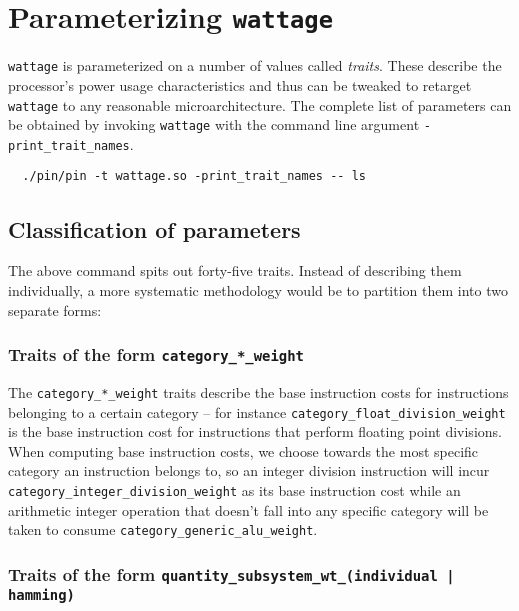 
\chapter{Parameterizing \texttt{wattage}} %

\label{AppendixA}


\texttt{wattage} is parameterized on a number of values called
\textit{traits}.  These describe the processor's power usage
characteristics and thus can be tweaked to retarget \texttt{wattage}
to any reasonable microarchitecture.  The complete list of parameters
can be obtained by invoking \texttt{wattage} with the command line
argument \texttt{-print\_trait\_names}.

\begin{verbatim}
  ./pin/pin -t wattage.so -print_trait_names -- ls
\end{verbatim}

\section{Classification of parameters}

The above command spits out forty-five traits.  Instead of describing
them individually, a more systematic methodology would be to partition
them into two separate forms:

\subsection{Traits of the form \texttt{category\_*\_weight}}

The \texttt{category\_*\_weight} traits describe the base instruction
costs for instructions belonging to a certain category -- for instance
\texttt{category\_float\_division\_weight} is the base instruction
cost for instructions that perform floating point divisions.  When
computing base instruction costs, we choose towards the most specific
category an instruction belongs to, so an integer division instruction
will incur \texttt{category\_integer\_division\_weight} as its base
instruction cost while an arithmetic integer operation that doesn't
fall into any specific category will be taken to consume
\texttt{category\_generic\_alu\_weight}.

\subsection{Traits of the form \texttt{quantity\_subsystem\_wt\_(individual | hamming) }}

